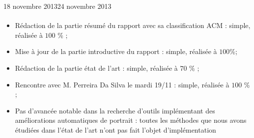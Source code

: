 \documentclass[12pt]{fiche-rd-info}
\begin{document}

\begin{fichesuivi}{18 novembre 2013}{24 novembre 2013}
\paragraph{}
	\begin{travaileffectue}
		\begin{itemize}
			\item Rédaction de la partie résumé du rapport avec sa classification ACM : simple, réalisée à $100$ \% ;
			\item Mise à jour de la partie introductive du rapport : simple, réalisée à $100$\%;
			\item Rédaction de la partie état de l’art : simple, réalisée à $70$ \% ;
			\item Rencontre avec M. Perreira Da Silva le mardi 19/11 : simple, réalisée à $100$ \% ;
		\end{itemize}
	\end{travaileffectue}

\begin{travailnoneffectue}
		\begin{itemize}
			\item Pas d’avancée notable dans la recherche d'outils implémentant des améliorations automatiques de portrait : toutes les méthodes que nous avons étudiées dans l’état de l’art n’ont pas fait l’objet d’implémentation		\end{itemize}
	\end{travailnoneffectue}
		

\end{fichesuivi}
\end{document}
